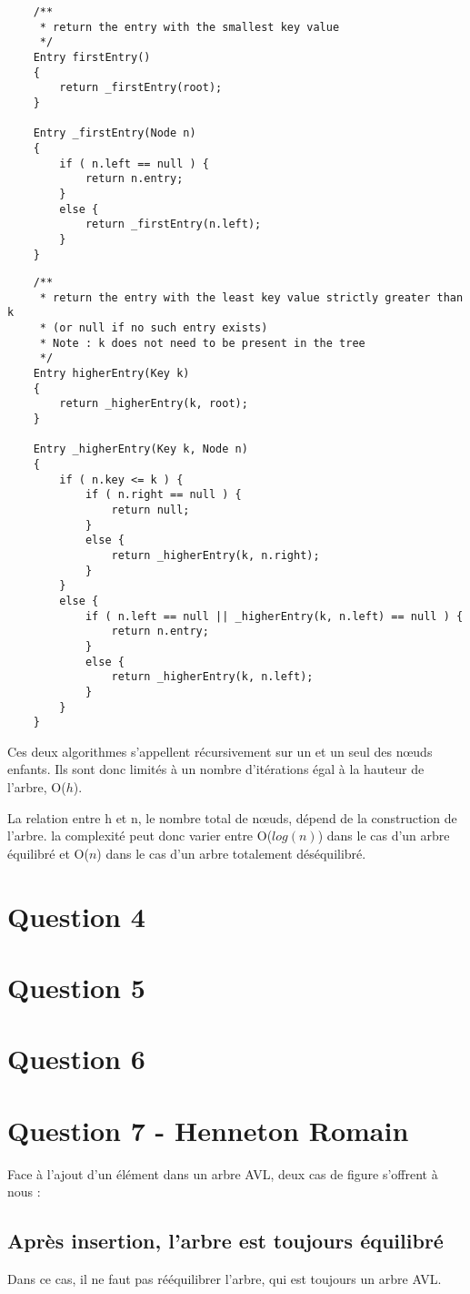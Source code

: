 \documentclass[10pt,a4paper]{article}
\begin{document}
	\begin{lstlisting}
	/**
	 * return the entry with the smallest key value
	 */
	Entry firstEntry()
	{
		return _firstEntry(root);
	}
	
	Entry _firstEntry(Node n)
	{
		if ( n.left == null ) {
			return n.entry;
		}
		else {
			return _firstEntry(n.left);
		}
	}
	\end{lstlisting}
	
	\begin{lstlisting}
	/**
	 * return the entry with the least key value strictly greater than k 
	 * (or null if no such entry exists)
	 * Note : k does not need to be present in the tree
	 */
	Entry higherEntry(Key k)
	{
		return _higherEntry(k, root);
	}
	
	Entry _higherEntry(Key k, Node n)
	{
		if ( n.key <= k ) {
			if ( n.right == null ) {
				return null;
			}
			else {
				return _higherEntry(k, n.right);
			}
		}
		else {
			if ( n.left == null || _higherEntry(k, n.left) == null ) {
				return n.entry;
			}
			else {
				return _higherEntry(k, n.left);
			}
		}
	}
	\end{lstlisting}
	
	Ces deux algorithmes s'appellent récursivement sur un et un seul des nœuds enfants. Ils sont donc limités à un nombre d'itérations égal à la hauteur de l'arbre, O($h$).
	
	La relation entre h et n, le nombre total de nœuds, dépend de la construction de l'arbre. la complexité peut donc varier entre O($log(n)$) dans le cas d'un arbre équilibré et O($n$) dans le cas d'un arbre totalement déséquilibré.
	
\section*{Question 4}
\section*{Question 5}
\section*{Question 6}
\section*{Question 7 - Henneton Romain}
Face à l'ajout d'un élément dans un arbre AVL, deux cas de figure s'offrent à nous :
\subsection*{Après insertion, l'arbre est toujours équilibré}
Dans ce cas, il ne faut pas rééquilibrer l'arbre, qui est toujours un arbre AVL. 
\end{document}
